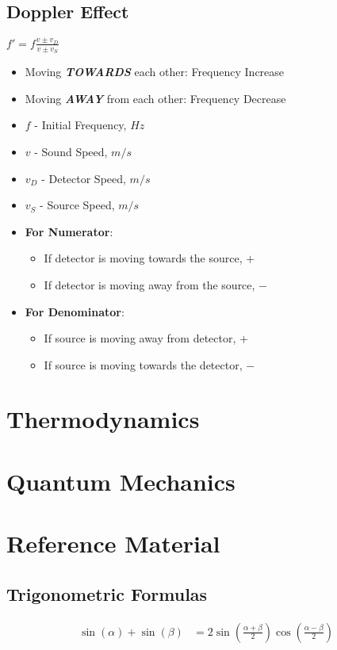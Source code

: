 \documentclass[10pt,letterpaper,final,twoside,notitlepage]{article}
\numberwithin{equation}{section} %
\begin{document}
	\subsection*{Doppler Effect} \label{subsec:Doppler Effect}
	{\Large $f' = f \frac{v \pm v_{D}}{v \pm v_{S}}$}
	\begin{itemize}[noitemsep]
		\item Moving \textit{\textbf{TOWARDS}} each other: Frequency Increase
		\item Moving \textit{\textbf{AWAY}} from each other: Frequency Decrease
		\item $f$ - Initial Frequency, $Hz$
		\item $v$ - Sound Speed, $m/s$
		\item $v_{D}$ - Detector Speed, $m/s$
		\item $v_{S}$ - Source Speed, $m/s$
		\item \textbf{For Numerator}:
			\begin{itemize}[noitemsep,nolistsep]
				\item If detector is moving towards the source, $+$
				\item If detector is moving away from the source, $-$
			\end{itemize}
		\item \textbf{For Denominator}:
			\begin{itemize}[noitemsep,nolistsep]
				\item If source is moving away from detector, $+$
				\item If source is moving towards the detector, $-$
			\end{itemize}
		\end{itemize}

\section{Thermodynamics} \label{sec:Thermo}
\section{Quantum Mechanics} \label{sec:Quantum Mech}
\section{Reference Material} \label{sec:Reference Material}
	\subsection{Trigonometric Formulas} \label{subsec:Trig Formulas}
	\begin{align}
		\sin \left( \alpha \right) + \sin \left( \beta \right) &= 2 \sin \left( \frac{\alpha + \beta}{2} \right) \cos\left( \frac{\alpha - \beta}{2} \right)  \label{eq:Sin plus Sin with diff Angles}
\end{align}
\end{document}
